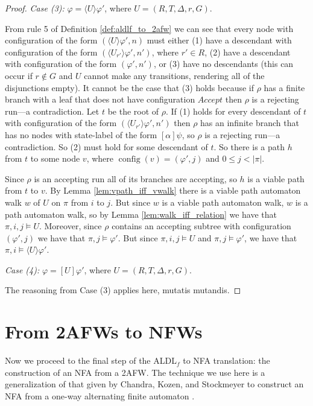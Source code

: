 \documentclass[10pt,a4paper]{amsart}
\theoremstyle{plain}
\theoremstyle{definition}
\theoremstyle{definition}
\newcommand{\dbox}[1]{\langle #1 \rangle}
\newcommand{\bbox}[1]{[ #1 ]}
\DeclareMathOperator{\config}{config}
\DeclareMathOperator{\?}{?}
\begin{document}
\begin{proof}
    \textit{Case (3):} $\varphi = \dbox{U}\varphi'$, where $U = (R,T,\Delta,r,G)$.

    From rule 5 of Definition \ref{def:aldlf_to_2afw} we can see that every node with configuration of the form $(\dbox{U}\varphi',n)$
    must either (1) have a descendant with configuration of the form $(\dbox{U_{r'}}\varphi',n')$, where $r' \in R$, (2) have a descendant with
    configuration of the form $(\varphi',n')$, or (3) have no descendants (this can occur if $r \not\in G$ and $U$ cannot make
    any transitions, rendering all of the disjunctions empty). It cannot be the case that (3) holds because if $\rho$ has a finite
    branch with a leaf that does not have configuration $Accept$ then $\rho$ is a rejecting run---a contradiction. Let $t$ be the root
    of $\rho$. If (1) holds for every descendant of $t$ with configuration of the form $(\dbox{U_{r'}}\varphi',n')$ then
    $\rho$ has an infinite branch that has no nodes with state-label of the form $\bbox{\alpha}\psi$, so $\rho$ is a rejecting run---a contradiction.
    So (2) must hold for some descendant of $t$. So there is a path $h$ from $t$ to some node $v$,
    where $\config(v) = (\varphi',j)$ and $0 \leq j < |\pi|$.

    Since $\rho$ is an accepting run all of its branches are accepting, so $h$ is a viable path from $t$ to $v$.
    By Lemma \ref{lem:vpath_iff_vwalk} there is a viable path automaton walk $w$ of $U$ on $\pi$ from $i$ to $j$. But since $w$ is a viable
    path automaton walk, $w$ is a path automaton walk, so by Lemma \ref{lem:walk_iff_relation} we have that $\pi,i,j \models U$.
    Moreover, since $\rho$ contains an accepting subtree with configuration $(\varphi',j)$ we have that $\pi,j \models \varphi'$.
    But since $\pi,i,j \models U$ and $\pi,j \models \varphi'$, we have that $\pi,i \models \dbox{U}\varphi'$.

    \textit{Case (4):} $\varphi = \bbox{U}\varphi'$, where $U = (R,T,\Delta,r,G)$.

    The reasoning from Case (3) applies here, mutatis mutandis.
\end{proof}


\section{From 2AFWs to NFWs}
\label{ch:2afwtonfw}

Now we proceed to the final step of the ALDL$_f$ to NFA translation: the construction of an NFA from a 2AFW. The technique we use here is a generalization of that given by Chandra, Kozen, and Stockmeyer to construct an NFA from a one-way alternating finite automaton \cite{chandra}.
\end{document}
